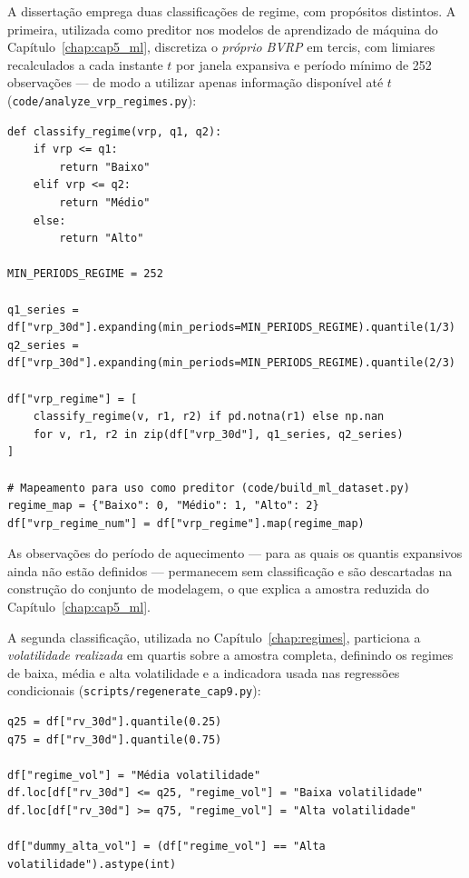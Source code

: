 A dissertação emprega duas classificações de regime, com propósitos
distintos. A primeira, utilizada como preditor nos modelos de aprendizado
de máquina do Capítulo~\ref{chap:cap5_ml}, discretiza o \emph{próprio
BVRP} em tercis, com limiares recalculados a cada instante $t$ por janela
expansiva e período mínimo de 252 observações --- de modo a utilizar
apenas informação disponível até $t$
(\texttt{code/analyze\_vrp\_regimes.py}):

\begin{verbatim}
def classify_regime(vrp, q1, q2):
    if vrp <= q1:
        return "Baixo"
    elif vrp <= q2:
        return "Médio"
    else:
        return "Alto"

MIN_PERIODS_REGIME = 252

q1_series = df["vrp_30d"].expanding(min_periods=MIN_PERIODS_REGIME).quantile(1/3)
q2_series = df["vrp_30d"].expanding(min_periods=MIN_PERIODS_REGIME).quantile(2/3)

df["vrp_regime"] = [
    classify_regime(v, r1, r2) if pd.notna(r1) else np.nan
    for v, r1, r2 in zip(df["vrp_30d"], q1_series, q2_series)
]

# Mapeamento para uso como preditor (code/build_ml_dataset.py)
regime_map = {"Baixo": 0, "Médio": 1, "Alto": 2}
df["vrp_regime_num"] = df["vrp_regime"].map(regime_map)
\end{verbatim}

As observações do período de aquecimento --- para as quais os quantis
expansivos ainda não estão definidos --- permanecem sem classificação e
são descartadas na construção do conjunto de modelagem, o que explica a
amostra reduzida do Capítulo~\ref{chap:cap5_ml}.

A segunda classificação, utilizada no Capítulo~\ref{chap:regimes},
particiona a \emph{volatilidade realizada} em quartis sobre a amostra
completa, definindo os regimes de baixa, média e alta volatilidade e a
indicadora usada nas regressões condicionais
(\texttt{scripts/regenerate\_cap9.py}):

\begin{verbatim}
q25 = df["rv_30d"].quantile(0.25)
q75 = df["rv_30d"].quantile(0.75)

df["regime_vol"] = "Média volatilidade"
df.loc[df["rv_30d"] <= q25, "regime_vol"] = "Baixa volatilidade"
df.loc[df["rv_30d"] >= q75, "regime_vol"] = "Alta volatilidade"

df["dummy_alta_vol"] = (df["regime_vol"] == "Alta volatilidade").astype(int)
\end{verbatim}

